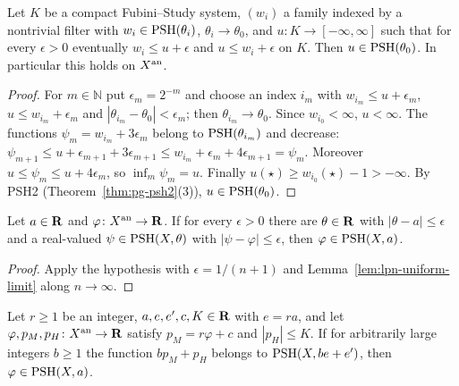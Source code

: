 \begin{lemma}\label{lem:lpn-uniform-limit}
\leanok
{}
Let $K$ be a compact Fubini--Study system, $(w_i)$ a family indexed by a nontrivial filter with
$w_i\in\operatorname{PSH}(\theta_i)$, $\theta_i\to\theta_0$, and $u\colon K\to[-\infty,\infty]$ such that for every
$\epsilon>0$ eventually $w_i\le u+\epsilon$ and $u\le w_i+\epsilon$ on $K$. Then $u\in\operatorname{PSH}(\theta_0)$. In particular
this holds on $X^{\mathrm{an}}$.
\end{lemma}

\begin{proof}
For $m\in\mathbb N$ put $\epsilon_m=2^{-m}$ and choose an index $i_m$ with $w_{i_m}\le u+\epsilon_m$,
$u\le w_{i_m}+\epsilon_m$ and $|\theta_{i_m}-\theta_0|<\epsilon_m$; then $\theta_{i_m}\to\theta_0$. Since
$w_{i_0}<\infty$, $u<\infty$. The functions $\psi_m=w_{i_m}+3\epsilon_m$ belong to $\operatorname{PSH}(\theta_{i_m})$ and
decrease: $\psi_{m+1}\le u+\epsilon_{m+1}+3\epsilon_{m+1}\le w_{i_m}+\epsilon_m+4\epsilon_{m+1}=\psi_m$. Moreover
$u\le\psi_m\le u+4\epsilon_m$, so $\inf_m\psi_m=u$. Finally $u(\star)\ge w_{i_0}(\star)-1>-\infty$. By PSH2
(Theorem~\ref{thm:pg-psh2}(3)), $u\in\operatorname{PSH}(\theta_0)$.
\end{proof}

\begin{lemma}\label{lem:lpn-approximation}
\leanok
{}
Let $a\in\mathbf{R}$ and $\varphi\colon X^{\mathrm{an}}\to\mathbf{R}$. If for every $\epsilon>0$ there are $\theta\in\mathbf{R}$ with
$|\theta-a|\le\epsilon$ and a real-valued $\psi\in\operatorname{PSH}(X,\theta)$ with $|\psi-\varphi|\le\epsilon$, then
$\varphi\in\operatorname{PSH}(X,a)$.
\end{lemma}

\begin{proof}
Apply the hypothesis with $\epsilon=1/(n+1)$ and Lemma~\ref{lem:lpn-uniform-limit} along $n\to\infty$.
\end{proof}

\begin{lemma}\label{lem:lpn-potential-family}
\leanok
{}
Let $r\ge1$ be an integer, $a,e,e',c,K\in\mathbf{R}$ with $e=ra$, and let $\varphi,p_M,p_H\colon X^{\mathrm{an}}\to\mathbf{R}$ satisfy
$p_M=r\varphi+c$ and $|p_H|\le K$. If for arbitrarily large integers $b\ge1$ the function $bp_M+p_H$ belongs to
$\operatorname{PSH}(X,be+e')$, then $\varphi\in\operatorname{PSH}(X,a)$.
\end{lemma}

